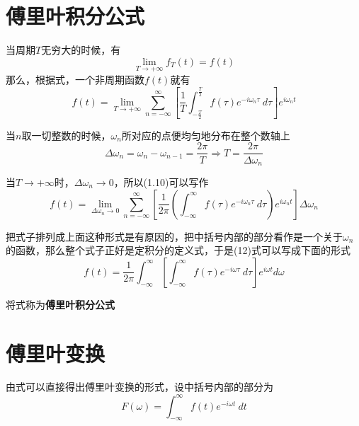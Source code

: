     \section{傅里叶积分公式}
        当周期$T$无穷大的时候，有
        \begin{equation}
            \lim_{T\to +\infty}f_T(t)=f(t)
            \label{eq: 1.9}
        \end{equation}
        那么，根据式，一个非周期函数$f(t)$就有
        \begin{equation}
            f(t)=\lim_{T\to +\infty}\sum\limits_{n=-\infty}^{\infty}\left[\dfrac{1}{T}\int_{-\frac{T}{2}}^{\frac{T}{2}}f(\tau)e^{-i\omega_n \tau}\ d\tau\right] e^{i\omega_n t}
            \label{eq: 1.10}
        \end{equation}

        当$n$取一切整数的时候，$\omega_n$所对应的点便均匀地分布在整个数轴上
        \begin{equation}
            \Delta\omega_n=\omega_n-\omega_{n - 1}=\dfrac{2\pi}{T}\Rightarrow T=\dfrac{2\pi}{\Delta\omega_n}
            \label{eq: 1.11}
        \end{equation}
        
        当$T\to +\infty$时，$\Delta\omega_n\to 0$，所以(1.10)可以写作
        \begin{equation}
            f(t)=\lim_{\Delta\omega_n\to 0}\sum\limits_{n=-\infty}^{\infty}\left[\dfrac{1}{2\pi}\left(\int_{-\infty}^{\infty}f(\tau)e^{-i\omega_n \tau}\ d\tau\right)e^{i\omega_n t}\right] \Delta\omega_n
            \label{eq: 1.12}
        \end{equation}
        
        把式子排列成上面这种形式是有原因的，把中括号内部的部分看作是一个关于$\omega_n$的函数，那么整个式子正好是定积分的定义式，于是(12)式可以写成下面的形式
        \begin{equation}
            f(t)=\dfrac{1}{2\pi}\int_{-\infty}^{\infty}\left[\int_{-\infty}^{\infty}f(\tau)e^{-i\omega \tau}\ d\tau\right] e^{i\omega t} d\omega
            \label{eq: 1.13}
        \end{equation}
        
        将式称为\textbf{傅里叶积分公式}

    \section{傅里叶变换}

        由式可以直接得出傅里叶变换的形式，设中括号内部的部分为
        \begin{equation}
            F(\omega)=\int_{-\infty}^{\infty}f(t)e^{-i\omega t}\ dt
            \label{eq: 1.14}
        \end{equation}

